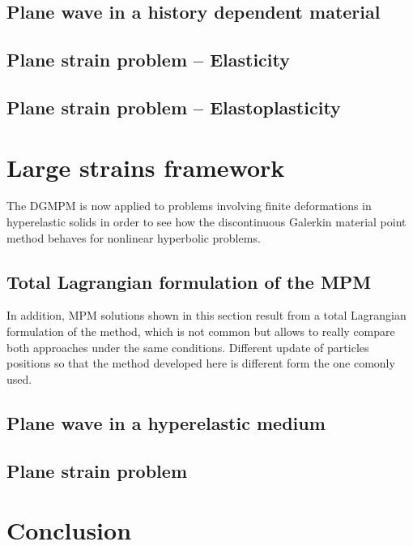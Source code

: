 \subsection{Plane wave in a history dependent material}
\label{sec:hpp_planewave}


\subsection{Plane strain problem -- Elasticity}
\label{sec:el_planestrain}


\subsection{Plane strain problem -- Elastoplasticity}
\label{sec:ep_planestrain}


\section{Large strains framework}
\label{sec:he_simulations}
The DGMPM is now applied to problems involving finite deformations in hyperelastic solids in order to see how the discontinuous Galerkin material point method behaves for nonlinear hyperbolic problems.
\subsection{Total Lagrangian formulation of the MPM}
In addition, MPM solutions shown in this section result from a total Lagrangian formulation of the method, which is not common but allows to really compare both approaches under the same conditions. Different update of particles positions so that the method developed here is different form the one comonly used.
\subsection{Plane wave in a hyperelastic medium}
\label{sec:he_planewave}


\subsection{Plane strain problem}
\label{sec:he_plate}




\section{Conclusion}
